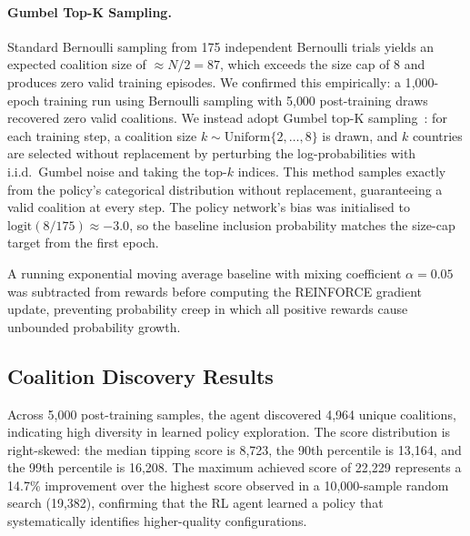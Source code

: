 \documentclass[11pt]{article}
\begin{document}
\paragraph{Gumbel Top-K Sampling.}
Standard Bernoulli sampling from 175 independent Bernoulli trials yields an expected coalition size of $\approx N/2 = 87$, which exceeds the size cap of 8 and produces zero valid training episodes. We confirmed this empirically: a 1{,}000-epoch training run using Bernoulli sampling with 5{,}000 post-training draws recovered zero valid coalitions. We instead adopt Gumbel top-K sampling~\cite{kool2019attention}: for each training step, a coalition size $k \sim \mathrm{Uniform}\{2, \ldots, 8\}$ is drawn, and $k$ countries are selected without replacement by perturbing the log-probabilities with i.i.d.\ Gumbel noise and taking the top-$k$ indices. This method samples exactly from the policy's categorical distribution without replacement, guaranteeing a valid coalition at every step. The policy network's bias was initialised to $\mathrm{logit}(8/175) \approx -3.0$, so the baseline inclusion probability matches the size-cap target from the first epoch.

A running exponential moving average baseline with mixing coefficient $\alpha = 0.05$ was subtracted from rewards before computing the REINFORCE gradient update, preventing probability creep in which all positive rewards cause unbounded probability growth.

\subsection{Coalition Discovery Results}
\label{sec:results_coalitions}

Across 5{,}000 post-training samples, the agent discovered 4{,}964 unique coalitions, indicating high diversity in learned policy exploration. The score distribution is right-skewed: the median tipping score is 8{,}723, the 90th percentile is 13{,}164, and the 99th percentile is 16{,}208. The maximum achieved score of 22{,}229 represents a 14.7\% improvement over the highest score observed in a 10{,}000-sample random search (19{,}382), confirming that the RL agent learned a policy that systematically identifies higher-quality configurations.
\end{document}
